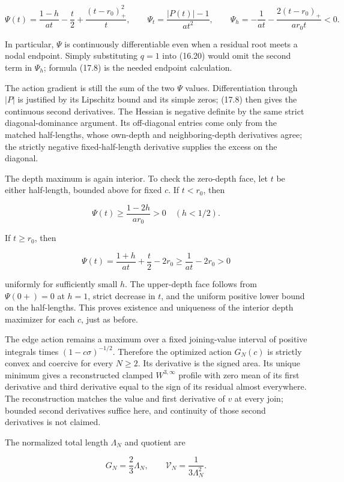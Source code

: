 \documentclass[11pt]{article}
\begin{document}
\[
\Psi(t)=\frac{1-h}{at}-\frac t2+
\frac{(t-r_0)_+^2}{t},\qquad
\Psi_t=\frac{|P(t)|-1}{at^2},\qquad
\Psi_h=-\frac1{at}-\frac{2(t-r_0)_+}{a r_0t}<0.
\tag{17.8}
\]

In particular, \(\Psi\) is continuously differentiable even when a
residual root meets a nodal endpoint. Simply substituting \(q=1\) into
(16.20) would omit the second term in \(\Psi_h\); formula (17.8) is the
needed endpoint calculation.

The action gradient is still the sum of the two \(\Psi\) values.
Differentiation through \(|P|\) is justified by its Lipschitz bound and
its simple zeros; (17.8) then gives the continuous second derivatives.
The Hessian is negative definite by the same strict diagonal-dominance
argument. Its off-diagonal entries come only from the matched
half-lengths, whose own-depth and neighboring-depth derivatives agree;
the strictly negative fixed-half-length derivative supplies the excess
on the diagonal.

The depth maximum is again interior. To check the zero-depth face, let
\(t\) be either half-length, bounded above for fixed \(c\). If
\(t<r_0\), then

\[
\Psi(t)\ge\frac{1-2h}{a r_0}>0\quad(h<1/2).
\]

If \(t\ge r_0\), then

\[
\Psi(t)=\frac{1+h}{at}+\frac t2-2r_0
\ge\frac1{at}-2r_0>0
\]

uniformly for sufficiently small \(h\). The upper-depth face follows
from \(\Psi(0+)=0\) at \(h=1\), strict decrease in \(t\), and the
uniform positive lower bound on the half-lengths. This proves existence
and uniqueness of the interior depth maximizer for each \(c\), just as
before.

The edge action remains a maximum over a fixed joining-value interval of
positive integrals times \((1-c\sigma)^{-1/2}\). Therefore the optimized
action \(G_N(c)\) is strictly convex and coercive for every \(N\ge2\).
Its derivative is the signed area. Its unique minimum gives a
reconstructed clamped \(W^{3,\infty}\) profile with zero mean of its
first derivative and third derivative equal to the sign of its residual
almost everywhere. The reconstruction matches the value and first
derivative of \(v\) at every join; bounded second derivatives suffice
here, and continuity of those second derivatives is not claimed.

The normalized total length \(\Lambda_N\) and quotient are

\[
G_N=\frac23\Lambda_N,\qquad
\mathcal V_N=\frac1{3\Lambda_N^2}.
\tag{17.9}
\]
\end{document}
